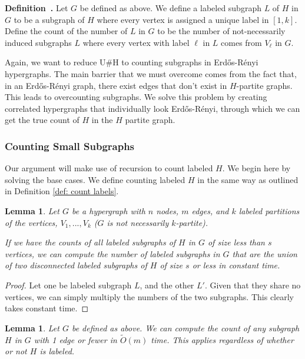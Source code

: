 \documentclass[11pt,letterpaper,pdftex]{article}
\newtheorem{lemma}[theorem]{Lemma}
\newcounter{definition}
\newenvironment{definition}[1][]{\refstepcounter{definition}\par\medskip
   \noindent \textbf{Definition~\thedefinition. #1} \rmfamily}{\medskip}
\def\Otil{\tilde{O}}
\begin{document}
\begin{definition}\label{def: count labels}
Let $G$ be defined as above. We define a labeled subgraph $L$ of $H$ in $G$ to be a subgraph of $H$ where every vertex is assigned a unique label in $[1,k]$. Define the count of the number of $L$ in $G$ to be the number of not-necessarily induced subgraphs $L$ where every vertex with label $\ell$ in $L$ comes from $V_\ell$ in $G$.
\end{definition}

Again, we want to reduce U\#H to counting subgraphs in Erd{\H{o}}s-R{\'{e}}nyi hypergraphs. The main barrier that we must overcome comes from the fact that, in an Erd{\H{o}}s-R{\'{e}}nyi graph, there exist edges that don't exist in $H$-partite graphs. This leads to overcounting subgraphs. We solve this problem by creating correlated hypergraphs 
that individually look Erd{\H{o}}s-R{\'{e}}nyi, through which we can get the true count of $H$ in the $H$ partite graph.

\subsubsection{Counting Small Subgraphs}
Our argument will make use of recursion to count labeled $H$. We begin here by solving the base cases. We define counting labeled $H$ in the same way as outlined in 
Definition \ref{def: count labels}.

\begin{lemma}\label{lem: disconnected count}
Let $G$ be a hypergraph with $n$ nodes, $m$ edges, and $k$ labeled partitions of the vertices, $V_1,...,V_k$ ($G$ is not necessarily $k$-partite).

If we have the counts of all labeled subgraphs of $H$ in $G$ of size less than $s$ vertices, we can compute the number of labeled subgraphs in $G$ that are the union of two disconnected labeled subgraphs of $H$ of size $s$ or less in constant time.
\end{lemma}

\begin{proof}
Let one be labeled subgraph $L$, and the other $L'$. Given that they share no vertices, we can simply multiply the numbers of the two subgraphs. This clearly takes constant time.
\end{proof}

\begin{lemma}\label{lem: tiny count}
Let $G$ be defined as above. We can compute the count of any subgraph $H$ in $G$ with 1 edge or fewer in $\Otil(m)$ time. This applies regardless of whether or not $H$ is labeled.
\end{lemma}
\end{document}
